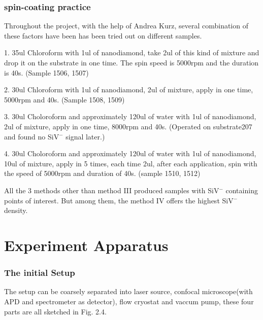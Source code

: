  
\subsubsection{spin-coating practice}
Throughout the project, with the help of Andrea Kurz, several combination of these factors have been has been tried out on different samples.

1. 35ul Chloroform with 1ul of nanodiamond, take 2ul of this kind of mixture and drop it on the substrate in one time. The spin speed is 5000rpm and the duration is 40s. (Sample 1506, 1507)

2. 30ul Chloroform with 1ul of nanodiamond, 2ul of mixture, apply in one time, 5000rpm and 40s. (Sample 1508, 1509)

3. 30ul Choloroform and approximately 120ul of water with 1ul of nanodiamond, 2ul of mixture, apply in one time, 8000rpm and 40s. (Operated on substrate207 and found no SiV$^{-}$ signal later.)

4. 30ul Choloroform and approximately 120ul of water with 1ul of nanodiamond, 10ul of mixture, apply in 5 times, each time 2ul, after each application, spin with the speed of 5000rpm and  duration of 40s. (sample 1510, 1512)

All the 3 methods other than method III produced samples with SiV$^{-}$ containing points of interest. But among them, the method IV offers the highest SiV$^{-}$ density.
 

\section[experiment apparatus]{Experiment Apparatus}

\subsubsection{The initial Setup} 

The setup can be coarsely separated into laser source, confocal microscope(with APD and spectrometer as detector), flow cryostat and vaccum pump, these four parts are all sketched in Fig. 2.4.


